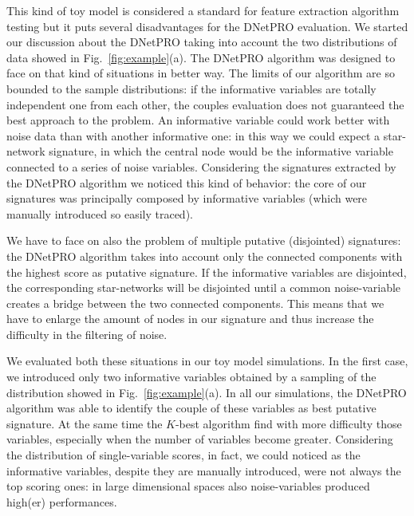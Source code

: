 \documentclass{standalone}
\begin{document}
This kind of toy model is considered a standard for feature extraction algorithm testing but it puts several disadvantages for the \textsf{DNetPRO} evaluation.
We started our discussion about the \textsf{DNetPRO} taking into account the two distributions of data showed in Fig.~\ref{fig:example}(a).
The \textsf{DNetPRO} algorithm was designed to face on that kind of situations in better way.
The limits of our algorithm are so bounded to the sample distributions: if the informative variables are totally independent one from each other, the couples evaluation does not guaranteed the best approach to the problem.
An informative variable could work better with noise data than with another informative one: in this way we could expect a star-network signature, in which the central node would be the informative variable connected to a series of noise variables.
Considering the signatures extracted by the \textsf{DNetPRO} algorithm we noticed this kind of behavior: the core of our signatures was principally composed by informative variables (which were manually introduced so easily traced).

We have to face on also the problem of multiple putative (disjointed) signatures: the \textsf{DNetPRO} algorithm takes into account only the connected components with the highest score as putative signature.
If the informative variables are disjointed, the corresponding star-networks will be disjointed until a common noise-variable creates a bridge between the two connected components.
This means that we have to enlarge the amount of nodes in our signature and thus increase the difficulty in the filtering of noise.

We evaluated both these situations in our toy model simulations.
In the first case, we introduced only two informative variables obtained by a sampling of the distribution showed in Fig.~\ref{fig:example}(a).
In all our simulations, the \textsf{DNetPRO} algorithm was able to identify the couple of these variables as best putative signature.
At the same time the $K$-best algorithm find with more difficulty those variables, especially when the number of variables become greater.
Considering the distribution of single-variable scores, in fact, we could noticed as the informative variables, despite they are manually introduced, were not always the top scoring ones: in large dimensional spaces also noise-variables produced high(er) performances.
\end{document}
